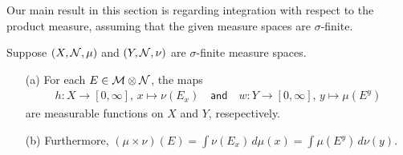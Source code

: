 Our main result in this section is regarding integration with respect to the product measure, assuming that the given measure spaces are $\sigma$-finite.
\begin{thm}
    Suppose $(X, {\mathcal{N}}, \mu)$ and $(Y, {\mathcal{N}}, \nu)$ are $\sigma$-finite measure spaces.
    \begin{enumerate}
        \item[(a)]
        {
            For each $E\in{\mathcal{M}}\otimes{\mathcal{N}}$, the maps
            \begin{align*}
                h: X\rightarrow[0, \infty],\,x\mapsto \nu(E_x)
                \quad\textsf{and}\quad
                w: Y\rightarrow[0, \infty],\,y\mapsto \mu(E^y)
            \end{align*}
            are measurable functions on $X$ and $Y$, resepectively.
        }
        \item[(b)]
        {
            Furthermore, $(\mu\times\nu)(E)=\int\nu(E_x)\,d\mu(x)=\int\mu(E^y)\,d\nu(y)$.
        }
    \end{enumerate}
\end{thm}
